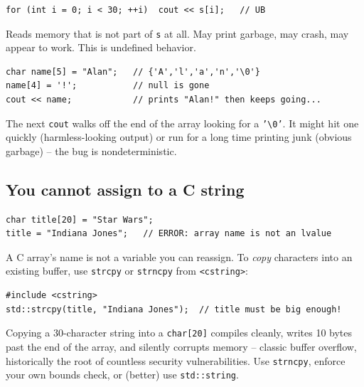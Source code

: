 \documentclass[11pt]{article}
\begin{document}
\begin{warnbox}
\begin{verbatim}
for (int i = 0; i < 30; ++i)  cout << s[i];   // UB
\end{verbatim}
Reads memory that is not part of \texttt{s} at all. May print garbage,
may crash, may appear to work. This is undefined behavior.
\end{warnbox}

\begin{warnbox}
\begin{verbatim}
char name[5] = "Alan";   // {'A','l','a','n','\0'}
name[4] = '!';           // null is gone
cout << name;            // prints "Alan!" then keeps going...
\end{verbatim}
The next \texttt{cout} walks off the end of the array looking for a
\texttt{'\textbackslash0'}. It might hit one quickly (harmless-looking
output) or run for a long time printing junk (obvious garbage) -- the
bug is nondeterministic.
\end{warnbox}

\subsection{You cannot assign to a C string}

\begin{examplebox}
\begin{verbatim}
char title[20] = "Star Wars";
title = "Indiana Jones";   // ERROR: array name is not an lvalue
\end{verbatim}
A C array's name is not a variable you can reassign. To \emph{copy}
characters into an existing buffer, use \texttt{strcpy} or
\texttt{strncpy} from \texttt{<cstring>}:
\begin{verbatim}
#include <cstring>
std::strcpy(title, "Indiana Jones");  // title must be big enough!
\end{verbatim}
\end{examplebox}

\begin{warnbox}
Copying a 30-character string into a \texttt{char[20]} compiles
cleanly, writes 10 bytes past the end of the array, and silently
corrupts memory -- classic buffer overflow, historically the root of
countless security vulnerabilities. Use \texttt{strncpy}, enforce your
own bounds check, or (better) use \texttt{std::string}.
\end{warnbox}
\end{document}
